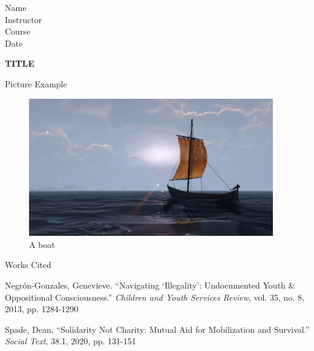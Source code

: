 \documentclass{article}
\newcommand{\bibent}{\noindent \hangindent 40pt}
\newenvironment{workscited}{\newpage \begin{center} Works Cited \end{center}}{\newpage }
\begin{document}
\begin{flushleft}

Name \\
Instructor \\
Course \\
Date \\

\begin{center}
    \textbf{TITLE}
\end{center}

\setlength{\parindent}{0.5in}
\newpage
Picture Example
\begin{figure}
    \includegraphics[width=0.95\textwidth]{./Examples/boat.jpg}
    \caption{A boat}
    \label{fig1: Boat}
\end{figure}

\begin{workscited}

\bibent
Negr\'{o}n-Gonzales, Genevieve. ``Navigating `Illegality': Undocumented Youth \& Oppositional Consciousness.'' \textit{Children and Youth Services Review}, vol. 35, no. 8, 2013, pp. 1284-1290

\bibent
Spade, Dean. ``Solidarity Not Charity: Mutual Aid for Mobilization and Survival.'' \textit{Social Text}, 38.1, 2020, pp. 131-151


\end{workscited}


\end{flushleft}
\end{document}
